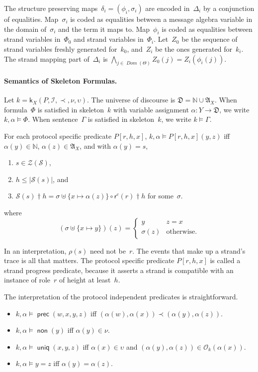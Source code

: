 \documentclass[12pt]{article}
\newcommand{\cn}[1]{\ensuremath{\operatorname{\mathsf{#1}}}}
\newcommand{\fn}[1]{\ensuremath{\operatorname{\mathit{#1}}}}
\newcommand{\sdom}{\fn{Dom}}
\newcommand{\prefix}[2]{#1\dagger#2}
\newcommand{\nat}{\ensuremath{\mathbb{N}}}
\newcommand{\alg}[1]{\ensuremath{\mathfrak{#1}}}
\newcommand{\msg}{\alg{A}}
\newcommand{\ssp}{\ensuremath{\mathcal{S}}}
\newcommand{\strands}{\ensuremath{\mathcal{Z}}}
\newcommand{\rl}{\ensuremath{\rho}}
\newcommand{\skel}{\mathsf{k}}
\newcommand{\insts}{\mathcal{I}}
\newcommand{\role}{\mathsf{r}}
\newcommand{\orig}{\mathcal{O}}
\begin{document}
The structure preserving maps~$\delta_i=(\phi_i,\sigma_i)$ are encoded
in~$\Delta_i$ by a conjunction of equalities.  Map~$\sigma_i$ is coded
as equalities between a message algebra variable in the domain
of~$\sigma_i$ and the term it maps to.  Map~$\phi_i$ is coded as
equalities between strand variables in~$\Phi_0$ and strand variables
in~$\Phi_i$.  Let~$Z_0$ be the sequence of strand variables freshly
generated for~$k_0$, and~$Z_i$ be the ones generated for~$k_i$.  The
strand mapping part of~$\Delta_i$ is
$\bigwedge_{j\in\sdom(\Theta)}Z_0(j)=Z_i(\phi_i(j))$.

\paragraph{Semantics of Skeleton Formulas.}

Let $k=\skel_X(P,\insts,\prec,\nu,\upsilon)$.  The universe of discourse is
$\alg{D}=\nat\cup\msg_X$.  When formula~$\Phi$ is satisfied in
skeleton~$k$ with variable assignment $\alpha\colon Y\to \alg{D}$, we
write $k,\alpha\models\Phi$.  When sentence~$\Gamma$ is satisfied in
skeleton~$k$, we write $k\models\Gamma$.

For each protocol specific predicate $P[r,h,x]$, $k,\alpha\models
P[r,h,x](y,z)$ iff $\alpha(y)\in\nat$, $\alpha(z)\in\msg_X$, and with
$\alpha(y)=s$,

\begin{enumerate}
\item $s\in\strands(\ssp)$,
\item $h\leq|\ssp(s)|$, and
\item $\prefix{\ssp(s)}{h}=\sigma\uplus\{x\mapsto\alpha(z)\}\circ
  \prefix{\role^c(r)}{h}$ for some~$\sigma$.
\end{enumerate}
where \[(\sigma\uplus\{x\mapsto y\})(z)=
\left\{
\begin{array}{ll}
y&z=x\\
\sigma(z)&\mbox{otherwise.}
\end{array}\right.\]

In an interpretation, $\rl(s)$ need not be~$r$.  The events that make
up a strand's trace is all that matters.  The protocol specific
predicate $P[r,h,x]$ is called a strand progress predicate, because it
asserts a strand is compatible with an instance of role~$r$ of height
at least~$h$.

The interpretation of the protocol independent predicates is
straightforward.
\begin{itemize}
\item $k,\alpha\models\cn{prec}(w,x,y,z)$ iff
$(\alpha(w),\alpha(x))\prec(\alpha(y),\alpha(z))$.
\item $k,\alpha\models\cn{non}(y)$ iff $\alpha(y)\in\nu$.
\item $k,\alpha\models\cn{uniq}(x,y,z)$ iff $\alpha(x)\in\upsilon$ and
  $(\alpha(y),\alpha(z))\in\orig_k(\alpha(x))$.
\item $k,\alpha\models y=z$ iff $\alpha(y)=\alpha(z)$.
\end{itemize}
\end{document}
